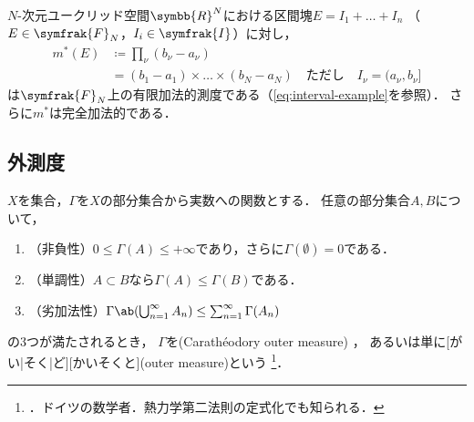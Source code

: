 \documentclass[../sotsu.tex]{subfiles}
\begin{document}
\begin{proposition}
    \label{thm:Lebesgue-finitely-additive-measure}
    $N$-次元ユークリッド空間$\symbb{R}^N$における区間塊$E = I_1 + \dots + I_n$
    （$E \in \symfrak{F}_N$，$I_i \in \symfrak{I}$）に対し，
    \begin{equation}
        \begin{split}
            m^* (E)  &\coloneq  \prod_\nu (b_\nu - a_\nu)  \\
                     &=  (b_1 - a_1) \times \dots \times (b_N - a_N)
                     \quad \text{ただし} \quad I_\nu = (a_\nu, b_\nu]
        \end{split}
    \end{equation}
    は$\symfrak{F}_N$上の有限加法的測度である（\cref{eq:interval-example}を参照）．
    さらに$m^*$は完全加法的である．
\end{proposition}



\subsection{外測度}

\begin{definition}[外測度]
    $X$を集合，$\Gamma$を$X$の部分集合から実数への関数とする．
    任意の部分集合$A, B$について，
    \begin{enumerate}
        \item （非負性）$0 \leq \Gamma(A) \leq +\infty$であり，さらに$\Gamma(\emptyset) = 0$である．
        \item （単調性）$A \subset B$なら$\Gamma(A) \leq \Gamma(B)$である．
        \item （劣加法性）$\Gamma \ab( \bigcup_{n=1}^{\infty} A_n ) \leq \sum_{n=1}^{\infty} \Gamma(A_n)$
    \end{enumerate}
    の3つが満たされるとき，
    $\Gamma$を(Carathéodory outer measure)%
    \cite{rikagaku-eiwa}，
    あるいは単に[がい|そく|ど][かいそくと](outer measure)という\cite{ito-lebesgue-1963}%
    \footnote{．ドイツの数学者．熱力学第二法則の定式化でも知られる．\cite{nipponica}}．
\end{definition}
\end{document}
